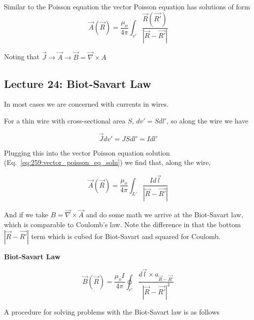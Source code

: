 \documentclass[10pt]{article}
\begin{document}
Similar to the Poisson equation the vector Poisson equation has solutions of form
\begin{equation}
	\vec{A}(\vec{R}) = \frac{\mu_o}{4\pi} \int_{v'} \frac{\vec{R}(\vec{R'})}{|\vec{R} - \vec{R'}|}
	\label{eq:259:vector_poisson_eq_soln}
\end{equation}

Noting that $ \vec{J} \rightarrow \vec{A} \rightarrow \vec{B} = \vec{\nabla} \times  A $ 



\subsection{Lecture 24: Biot-Savart Law}

In most cases we are concerned with currents in wires.

For a thin wire with cross-sectional area $ S $, $ dv' = Sdl' $, so along the wire we have

\begin{equation}
	\vec{J}dv' = JS dl' = Idl'
\end{equation}

Plugging this into the vector Poisson equation solution (Eq.~\ref{eq:259:vector_poisson_eq_soln}) we find that, along the wire,

\begin{equation}
	\vec{A}(\vec{R}) = \frac{\mu_o}{4\pi} \int_{L'} \frac{I d \vec{l}}{|\vec{R} - \vec{R'}|}
\end{equation}

And if we take $ B = \vec{\nabla} \times \vec{A} $ and do some math we arrive at the Biot-Savart law, which is comparable to Coulomb's law. Note the difference in that the bottom $  |\vec{R} -  \vec{R'}| $  term which is cubed for Biot-Savart and squared for Coulomb.



\begin{definition}
	\textbf{Biot-Savart Law} 

	\begin{equation}
		\vec{B}(\vec{R}) = \frac{\mu_o I}{4\pi} \oint_{c'} \frac{d \vec{l} \times a_{\vec{R} - \vec{R'}} }{|\vec{R} - \vec{R'}|^3}
		\label{eq:259:biot_savart}
	\end{equation}

\end{definition}

A procedure for solving problems with the Biot-Savart law is as follows
\end{document}
